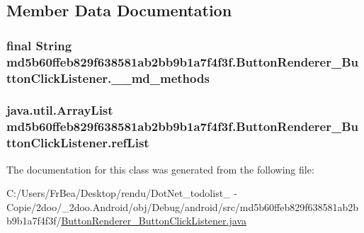 \subsection{Member Data Documentation}
\hypertarget{classmd5b60ffeb829f638581ab2bb9b1a7f4f3f_1_1_button_renderer___button_click_listener_0ba3db9168a35b7cd52aeb7a3d5cbf30}{
\subsubsection[{\_\-\_\-md\_\-methods}]{\setlength{\rightskip}{0pt plus 5cm}final String {\bf md5b60ffeb829f638581ab2bb9b1a7f4f3f.ButtonRenderer\_\-ButtonClickListener.\_\-\_\-md\_\-methods}}}
\label{classmd5b60ffeb829f638581ab2bb9b1a7f4f3f_1_1_button_renderer___button_click_listener_0ba3db9168a35b7cd52aeb7a3d5cbf30}


\hypertarget{classmd5b60ffeb829f638581ab2bb9b1a7f4f3f_1_1_button_renderer___button_click_listener_f639c4bd0d6eefc3ae17ee1061f4dad3}{
\subsubsection[{refList}]{\setlength{\rightskip}{0pt plus 5cm}java.util.ArrayList {\bf md5b60ffeb829f638581ab2bb9b1a7f4f3f.ButtonRenderer\_\-ButtonClickListener.refList}}}
\label{classmd5b60ffeb829f638581ab2bb9b1a7f4f3f_1_1_button_renderer___button_click_listener_f639c4bd0d6eefc3ae17ee1061f4dad3}




The documentation for this class was generated from the following file:\begin{CompactItemize}
\item 
C:/Users/FrBea/Desktop/rendu/DotNet\_\-todolist\_ - Copie/2doo/\_\-2doo.Android/obj/Debug/android/src/md5b60ffeb829f638581ab2bb9b1a7f4f3f/\hyperlink{md5b60ffeb829f638581ab2bb9b1a7f4f3f_2_button_renderer___button_click_listener_8java}{ButtonRenderer\_\-ButtonClickListener.java}\end{CompactItemize}
